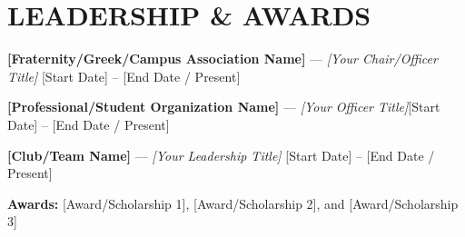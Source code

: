 \documentclass[10pt,letterpaper]{article}
\begin{document}
\section*{LEADERSHIP \& AWARDS}

\textbf{[Fraternity/Greek/Campus Association Name]} — \textit{[Your Chair/Officer Title]} \hfill {\small [Start Date] – [End Date / Present]}

\vspace{2pt}
\textbf{[Professional/Student Organization Name]} — \textit{[Your Officer Title]}\hfill {\small [Start Date] – [End Date / Present]}

\vspace{2pt}
\textbf{[Club/Team Name]} — \textit{[Your Leadership Title]} \hfill {\small [Start Date] – [End Date / Present]}

\vspace{2pt}
\textbf{Awards:} [Award/Scholarship 1], [Award/Scholarship 2], and [Award/Scholarship 3]
\end{document}
